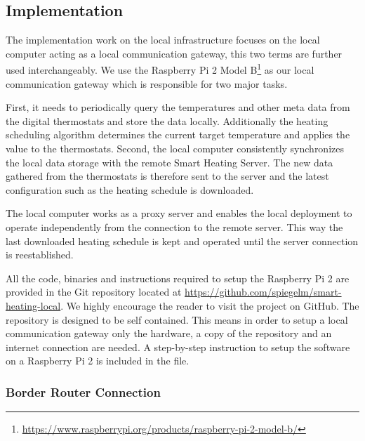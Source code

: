 \subsection{Implementation}
\label{sec:local_infrastructure_implementation}

The implementation work on the local infrastructure focuses on the local computer acting as a local communication gateway, this two terms are further used interchangeably.
We use the Raspberry Pi 2 Model B\footnote{\url{https://www.raspberrypi.org/products/raspberry-pi-2-model-b/}} as our local communication gateway which is responsible for two major tasks.

First, it needs to periodically query the temperatures and other meta data from the digital thermostats and store the data locally.
Additionally the heating scheduling algorithm determines the current target temperature and applies the value to the thermostats.
Second, the local computer consistently synchronizes the local data storage with the remote Smart Heating Server.
The new data gathered from the thermostats is therefore sent to the server and the latest configuration such as the heating schedule is downloaded.

The local computer works as a proxy server and enables the local deployment to operate independently from the connection to the remote server.
This way the last downloaded heating schedule is kept and operated until the server connection is reestablished.


All the code, binaries and instructions required to setup the Raspberry Pi 2 are provided in the Git repository located at \url{https://github.com/spiegelm/smart-heating-local}.
We highly encourage the reader to visit the project on GitHub.
The repository is designed to be self contained.
This means in order to setup a local communication gateway only the hardware, a copy of the repository and an internet connection are needed.
A step-by-step instruction to setup the software on a Raspberry Pi 2 is included in the  file.

\subsubsection{Border Router Connection}

